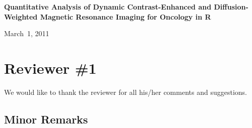 \documentclass[11pt]{article}
\begin{document}

\begin{center}
{\Large \textbf{Quantitative Analysis of Dynamic Contrast-Enhanced and Diffusion-Weighted Magnetic Resonance Imaging for Oncology in \textsf{R}}}

\bigskip

March~1, 2011

\end{center}

\section*{Reviewer \#1}

We would like to thank the reviewer for all his/her comments and
suggestions.

\subsection*{Minor Remarks}
\end{document}
